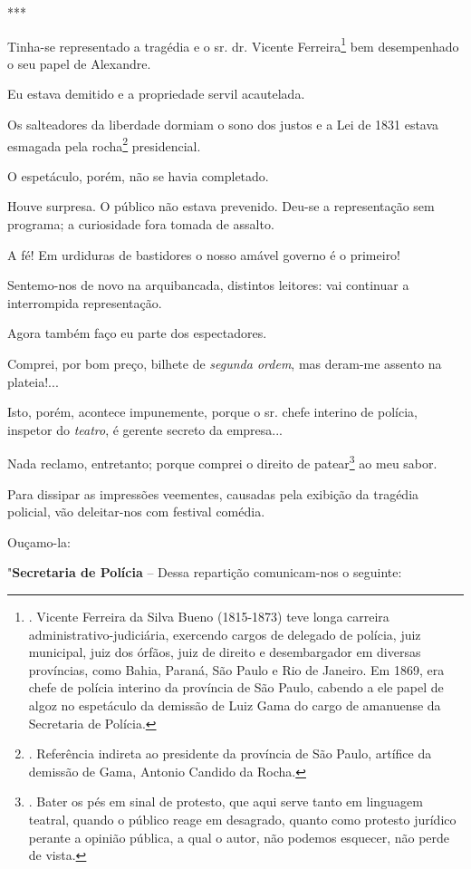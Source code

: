 ***

Tinha-se representado a tragédia e o sr. dr. Vicente Ferreira\footnote{.
  Vicente Ferreira da Silva Bueno (1815-1873) teve longa carreira
  administrativo-judiciária, exercendo cargos de delegado de polícia,
  juiz municipal, juiz dos órfãos, juiz de direito e desembargador em
  diversas províncias, como Bahia, Paraná, São Paulo e Rio de Janeiro.
  Em 1869, era chefe de polícia interino da província de São Paulo,
  cabendo a ele papel de algoz no espetáculo da demissão de Luiz Gama do
  cargo de amanuense da Secretaria de Polícia.} bem desempenhado o seu
papel de Alexandre.

Eu estava demitido e a propriedade servil acautelada.

Os salteadores da liberdade dormiam o sono dos justos e a Lei de 1831
estava esmagada pela rocha\footnote{. Referência indireta ao presidente
  da província de São Paulo, artífice da demissão de Gama, Antonio
  Candido da Rocha.} presidencial.

O espetáculo, porém, não se havia completado.

Houve surpresa. O público não estava prevenido. Deu-se a representação
sem programa; a curiosidade fora tomada de assalto.

A fé! Em urdiduras de bastidores o nosso amável governo é o primeiro!

Sentemo-nos de novo na arquibancada, distintos leitores: vai continuar a
interrompida representação.

Agora também faço eu parte dos espectadores.

Comprei, por bom preço, bilhete de \emph{segunda ordem}, mas deram-me
assento na plateia!...

Isto, porém, acontece impunemente, porque o sr. chefe interino de
polícia, inspetor do \emph{teatro}, é gerente secreto da empresa...

Nada reclamo, entretanto; porque comprei o direito de patear\footnote{.
  Bater os pés em sinal de protesto, que aqui serve tanto em linguagem
  teatral, quando o público reage em desagrado, quanto como protesto
  jurídico perante a opinião pública, a qual o autor, não podemos
  esquecer, não perde de vista.} ao meu sabor.

Para dissipar as impressões veementes, causadas pela exibição da
tragédia policial, vão deleitar-nos com festival comédia.

Ouçamo-la:

"\textbf{Secretaria de Polícia} -- Dessa repartição comunicam-nos o
seguinte:

